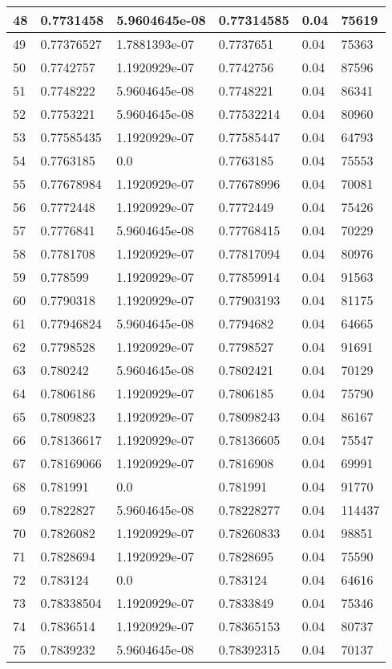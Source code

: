 \begin{longtable}{|l|l|l|l|l|l|}
48 & 0.7731458 & 5.9604645e-08 & 0.77314585 & 0.04 & 75619 \\ \hline 
49 & 0.77376527 & 1.7881393e-07 & 0.7737651 & 0.04 & 75363 \\ \hline 
50 & 0.7742757 & 1.1920929e-07 & 0.7742756 & 0.04 & 87596 \\ \hline 
51 & 0.7748222 & 5.9604645e-08 & 0.7748221 & 0.04 & 86341 \\ \hline 
52 & 0.7753221 & 5.9604645e-08 & 0.77532214 & 0.04 & 80960 \\ \hline 
53 & 0.77585435 & 1.1920929e-07 & 0.77585447 & 0.04 & 64793 \\ \hline 
54 & 0.7763185 & 0.0 & 0.7763185 & 0.04 & 75553 \\ \hline 
55 & 0.77678984 & 1.1920929e-07 & 0.77678996 & 0.04 & 70081 \\ \hline 
56 & 0.7772448 & 1.1920929e-07 & 0.7772449 & 0.04 & 75426 \\ \hline 
57 & 0.7776841 & 5.9604645e-08 & 0.77768415 & 0.04 & 70229 \\ \hline 
58 & 0.7781708 & 1.1920929e-07 & 0.77817094 & 0.04 & 80976 \\ \hline 
59 & 0.778599 & 1.1920929e-07 & 0.77859914 & 0.04 & 91563 \\ \hline 
60 & 0.7790318 & 1.1920929e-07 & 0.77903193 & 0.04 & 81175 \\ \hline 
61 & 0.77946824 & 5.9604645e-08 & 0.7794682 & 0.04 & 64665 \\ \hline 
62 & 0.7798528 & 1.1920929e-07 & 0.7798527 & 0.04 & 91691 \\ \hline 
63 & 0.780242 & 5.9604645e-08 & 0.7802421 & 0.04 & 70129 \\ \hline 
64 & 0.7806186 & 1.1920929e-07 & 0.7806185 & 0.04 & 75790 \\ \hline 
65 & 0.7809823 & 1.1920929e-07 & 0.78098243 & 0.04 & 86167 \\ \hline 
66 & 0.78136617 & 1.1920929e-07 & 0.78136605 & 0.04 & 75547 \\ \hline 
67 & 0.78169066 & 1.1920929e-07 & 0.7816908 & 0.04 & 69991 \\ \hline 
68 & 0.781991 & 0.0 & 0.781991 & 0.04 & 91770 \\ \hline 
69 & 0.7822827 & 5.9604645e-08 & 0.78228277 & 0.04 & 114437 \\ \hline 
70 & 0.7826082 & 1.1920929e-07 & 0.78260833 & 0.04 & 98851 \\ \hline 
71 & 0.7828694 & 1.1920929e-07 & 0.7828695 & 0.04 & 75590 \\ \hline 
72 & 0.783124 & 0.0 & 0.783124 & 0.04 & 64616 \\ \hline 
73 & 0.78338504 & 1.1920929e-07 & 0.7833849 & 0.04 & 75346 \\ \hline 
74 & 0.7836514 & 1.1920929e-07 & 0.78365153 & 0.04 & 80737 \\ \hline 
75 & 0.7839232 & 5.9604645e-08 & 0.78392315 & 0.04 & 70137 \\ \hline 
\end{longtable}